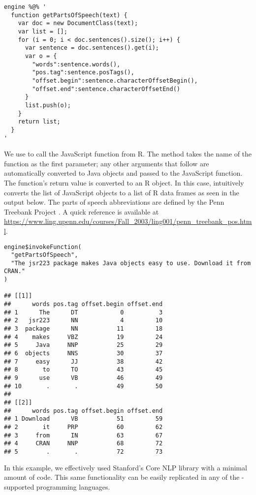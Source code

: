 \begin{verbatim}
engine %@% '
  function getPartsOfSpeech(text) {
    var doc = new DocumentClass(text);
    var list = [];
    for (i = 0; i < doc.sentences().size(); i++) {
      var sentence = doc.sentences().get(i);
      var o = {
        "words":sentence.words(),
        "pos.tag":sentence.posTags(),
        "offset.begin":sentence.characterOffsetBegin(),
        "offset.end":sentence.characterOffsetEnd()
      }
      list.push(o);
    }
    return list;
  }
'
\end{verbatim}
We use  to call the JavaScript function  from R. The method  takes the name of the function as the first parameter; any other arguments that follow are automatically converted to Java objects and passed to the JavaScript function. The function's return value is converted to an R object. In this case,  intuitively converts the list of JavaScript objects to a list of R data frames as seen in the output below. The parts of speech abbreviations are defined by the Penn Treebank Project \citep{penntreebankproject}. A quick reference is available at \url{https://www.ling.upenn.edu/courses/Fall_2003/ling001/penn_treebank_pos.html}.

\begin{verbatim}
engine$invokeFunction(
  "getPartsOfSpeech",
  "The jsr223 package makes Java objects easy to use. Download it from CRAN."
)

## [[1]]
##      words pos.tag offset.begin offset.end
## 1      The      DT            0          3
## 2   jsr223      NN            4         10
## 3  package      NN           11         18
## 4    makes     VBZ           19         24
## 5     Java     NNP           25         29
## 6  objects     NNS           30         37
## 7     easy      JJ           38         42
## 8       to      TO           43         45
## 9      use      VB           46         49
## 10       .       .           49         50
##
## [[2]]
##      words pos.tag offset.begin offset.end
## 1 Download      VB           51         59
## 2       it     PRP           60         62
## 3     from      IN           63         67
## 4     CRAN     NNP           68         72
## 5        .       .           72         73
\end{verbatim}

In this example, we effectively used Stanford's Core NLP library with a minimal amount of code. This same functionality can be easily replicated in any of the -supported programming languages.

